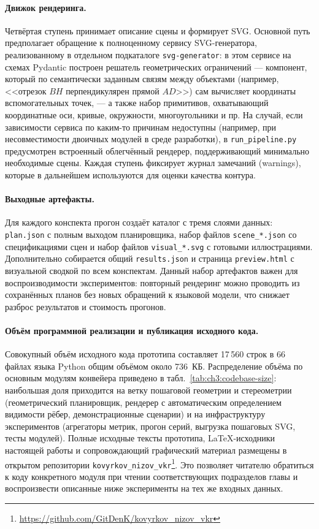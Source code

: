 \paragraph{Движок рендеринга.} Четвёртая ступень принимает описание сцены и формирует SVG. Основной путь предполагает обращение к полноценному сервису SVG\nobreakdash-генератора, реализованному в отдельном подкаталоге \texttt{svg-generator}: в этом сервисе на схемах Pydantic построен решатель геометрических ограничений --- компонент, который по семантически заданным связям между объектами (например, <<отрезок \(BH\) перпендикулярен прямой \(AD\)>>) сам вычисляет координаты вспомогательных точек, --- а также набор примитивов, охватывающий координатные оси, кривые, окружности, многоугольники и пр. На случай, если зависимости сервиса по каким-то причинам недоступны (например, при несовместимости двоичных модулей в среде разработки), в \texttt{run\_pipeline.py} предусмотрен встроенный облегчённый рендерер, поддерживающий минимально необходимые сцены. Каждая ступень фиксирует журнал замечаний (warnings), которые в дальнейшем используются для оценки качества контура.

\paragraph{Выходные артефакты.} Для каждого конспекта прогон создаёт каталог с тремя слоями данных: \texttt{plan.json} с полным выходом планировщика, набор файлов \texttt{scene\_*.json} со спецификациями сцен и набор файлов \texttt{visual\_*.svg} с готовыми иллюстрациями. Дополнительно собирается общий \texttt{results.json} и страница \texttt{preview.html} с визуальной сводкой по всем конспектам. Данный набор артефактов важен для воспроизводимости экспериментов: повторный рендеринг можно проводить из сохранённых планов без новых обращений к языковой модели, что снижает разброс результатов и стоимость прогонов.

\paragraph{Объём программной реализации и публикация исходного кода.} Совокупный объём исходного кода прототипа составляет 17\,560 строк в 66 файлах языка Python общим объёмом около 736~КБ. Распределение объёма по основным модулям конвейера приведено в табл.~\ref{tab:ch3:codebase-size}: наибольшая доля приходится на ветку пошаговой геометрии и стереометрии (геометрический планировщик, рендерер с автоматическим определением видимости рёбер, демонстрационные сценарии) и на инфраструктуру экспериментов (агрегаторы метрик, прогон серий, выгрузка пошаговых SVG, тесты модулей). Полные исходные тексты прототипа, LaTeX\nobreakdash-исходники настоящей работы и сопровождающий графический материал размещены в открытом репозитории \texttt{kovyrkov\_nizov\_vkr}\footnote{\url{https://github.com/GitDenK/kovyrkov_nizov_vkr}}. Это позволяет читателю обратиться к коду конкретного модуля при чтении соответствующих подразделов главы и воспроизвести описанные ниже эксперименты на тех же входных данных.

